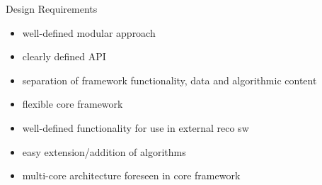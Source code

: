 \documentclass[12pt]{article}
\begin{document}
\huge
\begin{center}
{\sc Design Requirements}
\end{center}

\begin{itemize}
 \item well-defined modular approach
 \item clearly defined API
 \item separation of framework functionality, data and algorithmic content
 \item flexible core framework
 \item well-defined functionality for use in external reco sw
 \item easy extension/addition of algorithms
 \item multi-core architecture foreseen in core framework
\end{itemize}
\end{document}
